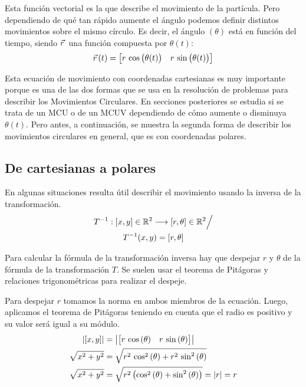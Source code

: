 \documentclass[a5paper,12pt,twoside]{book}
\begin{document}
Esta función vectorial es la que describe el movimiento de la partícula.
Pero dependiendo de qué tan rápido aumente el ángulo podemos definir distintos movimientos sobre el mismo círculo.
Es decir, el ángulo $(\theta)$ está en función del tiempo, siendo $\vec{r}\hspace{0.05cm}$ una función compuesta por $\theta (t)$:
\[
  \vec{r}\hspace{0.05cm}(t) =
    \begin{bmatrix}
        r \, \cos{\big( \theta (t) \big)} & r \, \sin{\big( \theta (t) \big)}
    \end{bmatrix}
\]

Esta ecuación de movimiento con coordenadas cartesianas es muy importante porque es una de las dos formas que se usa en la resolución de problemas para describir los Movimientos Circulares.
En secciones posteriores se estudia si se trata de un MCU o de un MCUV dependiendo de cómo aumente o disminuya $\theta(t)$.
Pero antes, a continuación, se muestra la segunda forma de describir los movimientos circulares en general, que es con coordenadas polares.

\subsection{De cartesianas a polares}

En algunas situaciones resulta útil describir el movimiento usando la inversa de la transformación.
\begin{multline*}
  T^{-1}:[x,y] \in \mathbb{R}^2 \longrightarrow [r,\theta] \in \mathbb{R}^2 \Big/ \\
  T^{-1} (x,y) = [r,\theta]
\end{multline*}

Para calcular la fórmula de la transformación inversa hay que despejar $r$ y $\theta$ de la fórmula de la transformación $T$.
Se suelen usar el teorema de Pitágoras y relaciones trigonométricas para realizar el despeje.

Para despejar $r$ tomamos la norma en ambos miembros de la ecuación.
Luego, aplicamos el teorema de Pitágoras teniendo en cuenta que el radio es positivo y su valor será igual a su módulo.
\begin{align*}
  {\left| {[x,y]} \right|} &= {\left| {\begin{bmatrix} r \, \cos{(\theta)} & r \, \sin{(\theta)} \end{bmatrix}} \right|}
  \\
  \sqrt{x^2 + y^2} &= \sqrt{r^2 \, \cos^2{(\theta)} + r^2 \, \sin^2{(\theta)}}
  \\
  \sqrt{x^2 + y^2} &= \sqrt{r^2 \left( \cos^2{(\theta)} + \sin^2{(\theta)} \right)} = |r| = r
\end{align*}
\end{document}
